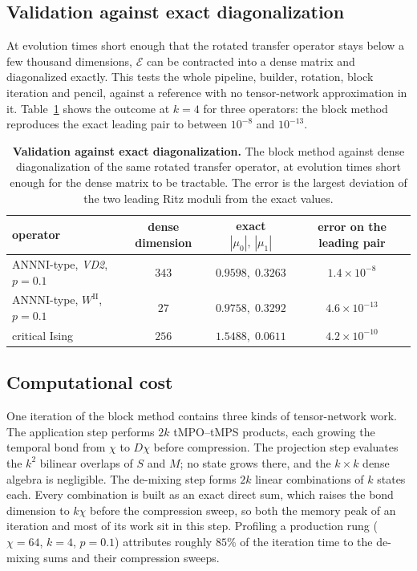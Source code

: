 \subsection{Validation against exact diagonalization}
\label{app:blockpm:validation}

At evolution times short enough that the rotated transfer operator stays below a few thousand dimensions, $\mathcal{E}$ can be contracted into a dense matrix and diagonalized exactly. This tests the whole pipeline, builder, rotation, block iteration and pencil, against a reference with no tensor-network approximation in it. Table~\ref{tab:blockpm_validation} shows the outcome at $k=4$ for three operators: the block method reproduces the exact leading pair to between $10^{-8}$ and $10^{-13}$.

\begin{table}[htbp]
  \centering
  \begin{tabular}{lccc}
    \hline
    operator & dense dimension & exact $|\mu_0|,\,|\mu_1|$ & error on the leading pair \\
    \hline
    ANNNI-type, \textit{VD2}, $p=0.1$ & $343$ & $0.9598,\;0.3263$ & $1.4\times10^{-8}$ \\
    ANNNI-type, $W^{\mathrm{II}}$, $p=0.1$ & $27$ & $0.9758,\;0.3292$ & $4.6\times10^{-13}$ \\
    critical Ising & $256$ & $1.5488,\;0.0611$ & $4.2\times10^{-10}$ \\
    \hline
  \end{tabular}
  \caption{\textbf{Validation against exact diagonalization.} The block method against dense diagonalization of the same rotated transfer operator, at evolution times short enough for the dense matrix to be tractable. The error is the largest deviation of the two leading Ritz moduli from the exact values.}
  \label{tab:blockpm_validation}
\end{table}

\subsection{Computational cost}
\label{app:blockpm:cost}

One iteration of the block method contains three kinds of tensor-network work. The application step performs $2k$ \ac{tMPO}--\ac{tMPS} products, each growing the temporal bond from $\chi$ to $D\chi$ before compression. The projection step evaluates the $k^2$ bilinear overlaps of $S$ and $M$; no state grows there, and the $k\times k$ dense algebra is negligible. The de-mixing step forms $2k$ linear combinations of $k$ states each. Every combination is built as an exact direct sum, which raises the bond dimension to $k\chi$ before the compression sweep, so both the memory peak of an iteration and most of its work sit in this step. Profiling a production rung ($\chi=64$, $k=4$, $p=0.1$) attributes roughly $85\%$ of the iteration time to the de-mixing sums and their compression sweeps.

